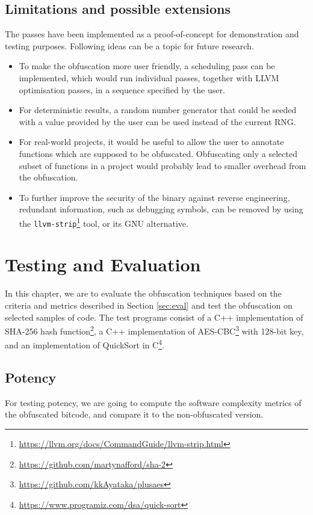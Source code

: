 \documentclass[
  digital, %
  notable,   %
  twoside, %
  nolof,     %
  nolot,     %
]{fithesis3}
\theoremstyle{definition}
\begin{document}
\section{Limitations and possible extensions}
The passes have been implemented as a proof-of-concept for demonstration and testing purposes. Following ideas can be a topic for future research.
\begin{itemize}
    \item To make the obfuscation more user friendly, a scheduling pass can be implemented, which would run individual passes, together with LLVM optimisation passes, in a sequence specified by the user. 
    \item For deterministic results, a random number generator that could be seeded with a value provided by the user can be used instead of the current RNG. 
    \item For real-world projects, it would be useful to allow the user to annotate functions which are supposed to be obfuscated. Obfuscating only a selected subset of functions in a project would probably lead to smaller overhead from the obfuscation. 
    \item To further improve the security of the binary against reverse engineering, redundant information, such as debugging symbols, can be removed by using the \texttt{llvm-strip}\footnote{\url{https://llvm.org/docs/CommandGuide/llvm-strip.html}} tool, or its GNU alternative. 
\end{itemize}

\chapter{Testing and Evaluation}
In this chapter, we are to evaluate the obfuscation techniques based on the criteria and metrics described in Section \ref{sec:eval} 
and test the obfuscation on selected samples of code. The test programs consist of a C++ implementation of SHA-256 hash function\footnote{\url{https://github.com/martynafford/sha-2}}, a C++ implementation of AES-CBC\footnote{\url{https://github.com/kkAyataka/plusaes}} with 128-bit key, and an implementation of QuickSort in C\footnote{\url{https://www.programiz.com/dsa/quick-sort}}.

\section{Potency}
For testing potency, we are going to compute the software complexity metrics of the obfuscated bitcode, and compare it to the non-obfuscated version. 
\end{document}
